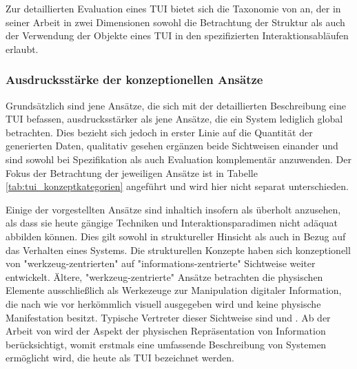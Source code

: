 Zur detaillierten Evaluation eines \gls{TUI} bietet sich die Taxonomie von \citet{Fishkin04} an, der in seiner Arbeit in zwei Dimensionen sowohl die Betrachtung der Struktur als auch der Verwendung der Objekte eines \gls{TUI} in den spezifizierten Interaktionsabläufen erlaubt.

\subsubsection{Ausdrucksstärke der konzeptionellen Ansätze} %
\label{ssub:ausdrucksstärke_der_konzeptionellen_ansätze}

Grundsätzlich sind jene Ansätze, die sich mit der detaillierten Beschreibung eine \gls{TUI} befassen, ausdrucksstärker als jene Ansätze, die ein System lediglich global betrachten. Dies bezieht sich jedoch in erster Linie auf die Quantität der generierten Daten, qualitativ gesehen ergänzen beide Sichtweisen einander und sind sowohl bei Spezifikation als auch Evaluation komplementär anzuwenden. Der Fokus der Betrachtung der jeweiligen Ansätze ist in Tabelle \ref{tab:tui_konzeptkategorien} angeführt und wird hier nicht separat unterschieden.

Einige der vorgestellten Ansätze sind inhaltich insofern als überholt anzusehen, als dass sie heute gängige Techniken und Interaktionsparadimen nicht adäquat abbilden können. Dies gilt sowohl in struktureller Hinsicht als auch in Bezug auf das Verhalten eines Systems. Die strukturellen Konzepte haben sich konzeptionell von "werkzeug-zentrierten" auf "informations-zentrierte" Sichtweise weiter entwickelt. Ältere, "werkzeug-zentrierte" Ansätze betrachten die physischen Elemente ausschließlich als Werkezeuge zur Manipulation digitaler Information, die nach wie vor herkömmlich visuell ausgegeben wird und keine physische Manifestation besitzt. Typische Vertreter dieser Sichtweise sind \citep{Fitzmaurice95} und \citep{Fitzmaurice96}. Ab der Arbeit von \citet{Ishii97} wird der Aspekt der physischen Repräsentation von Information berücksichtigt, womit erstmals eine umfassende Beschreibung von Systemen ermöglicht wird, die heute als \gls{TUI} bezeichnet werden.


